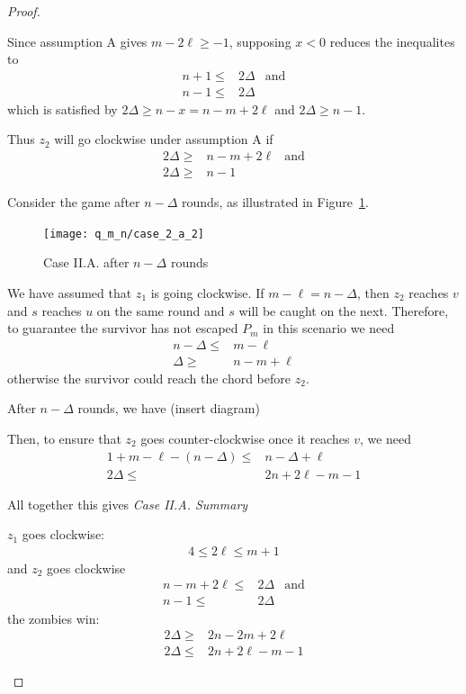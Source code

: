 \begin{proof}
\begin{proofpart}
  Since assumption A gives $m-2\ell \geq -1$, supposing $x < 0$ reduces the inequalites to
  \begin{align*}
   n+1 \leq & 2 \Delta & \text{and} \\
   n-1 \leq & 2 \Delta
  \end{align*}
  which is satisfied by $2\Delta \geq n-x = n-m+2\ell$ and $2\Delta \geq n-1$.

  Thus $z_2$ will go clockwise under assumption A if
  \begin{align*}
   2\Delta \geq & n-m+2\ell & \text{and} \\
    2\Delta \geq & n-1
  \end{align*}

  Consider the game after $n-\Delta$ rounds, as illustrated in Figure~\ref{fig:case_2_a_2}.

  \begin{figure}
    \centering
    \texttt{[image: q\_m\_n/case\_2\_a\_2]}
    \caption{Case II.A. after $n-\Delta$ rounds \label{fig:case_2_a_2}}
  \end{figure}

  We have assumed that $z_1$ is going clockwise. If $m - \ell = n - \Delta$,
  then $z_2$ reaches $v$ and $s$ reaches $u$ on the same round and $s$
  will be caught on the next. Therefore, to guarantee the survivor has not
  escaped $P_m$ in this scenario we need
  \begin{align*}
   n - \Delta \leq & m - \ell     \\
   \Delta \geq     & n - m + \ell
  \end{align*}
  otherwise the survivor could reach the chord before $z_2$.

  After $n-\Delta$ rounds, we have (insert diagram)

  Then, to ensure that $z_2$ goes counter-clockwise once
  it reaches $v$, we need
  \begin{align*}
   1 + m - \ell - (n - \Delta) \leq & n - \Delta + \ell  \\
   2 \Delta \leq                    & 2n + 2\ell - m - 1
  \end{align*}


  All together this gives
  \textit{Case II.A. Summary}

  $z_1$ goes clockwise:
  \begin{align*}
   4 \leq 2 \ell \leq m + 1
  \end{align*}
  and $z_2$ goes clockwise
  \begin{align*}
   n -m + 2\ell \leq & 2 \Delta & \text{and} \\
   n-1 \leq          & 2 \Delta
  \end{align*}
  the zombies win:
  \begin{align*}
   2 \Delta \geq & 2n - 2m + 2\ell    \\
   2 \Delta \leq & 2n + 2\ell - m - 1
  \end{align*}


\end{proofpart}
\end{proof}
